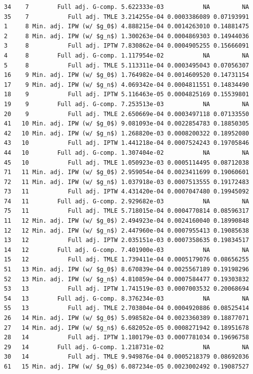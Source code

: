 \documentclass[11pt]{article}\usepackage[]{graphicx}\usepackage[]{color}
\makeatletter
\newenvironment{kframe}{%
 \def\at@end@of@kframe{}%
 \ifinner\ifhmode%
  \def\at@end@of@kframe{\end{minipage}}%
  \begin{minipage}{\columnwidth}%
 \fi\fi%
 \def\FrameCommand##1{\hskip\@totalleftmargin \hskip-\fboxsep
 \colorbox{shadecolor}{##1}\hskip-\fboxsep
     \hskip-\linewidth \hskip-\@totalleftmargin \hskip\columnwidth}%
 \MakeFramed {\advance\hsize-\width
   \@totalleftmargin\z@ \linewidth\hsize
   \@setminipage}}%
 {\par\unskip\endMakeFramed%
 \at@end@of@kframe}
\newenvironment{knitrout}{}{} %
\makeatother
\begin{document}
\begin{knitrout}
\begin{kframe}
\begin{verbatim}
34    7        Full adj. G-comp. 5.622333e-03           NA         NA
35    7           Full adj. TMLE 3.214255e-04 0.0003386089 0.07193991
1     8 Min. adj. IPW (w/ $g_0$) 4.888215e-04 0.0014263010 0.14881475
2     8 Min. adj. IPW (w/ $g_n$) 1.300263e-04 0.0004869303 0.14944036
3     8           Full adj. IPTW 7.830862e-04 0.0004905255 0.15666091
4     8        Full adj. G-comp. 1.117954e-02           NA         NA
5     8           Full adj. TMLE 5.113311e-04 0.0003495043 0.07056307
16    9 Min. adj. IPW (w/ $g_0$) 1.764982e-04 0.0014609520 0.14731154
17    9 Min. adj. IPW (w/ $g_n$) 4.069342e-04 0.0004811551 0.14834490
18    9           Full adj. IPTW 5.116463e-05 0.0004825169 0.15539801
19    9        Full adj. G-comp. 7.253513e-03           NA         NA
20    9           Full adj. TMLE 2.650669e-04 0.0003497118 0.07133550
41   10 Min. adj. IPW (w/ $g_0$) 9.081093e-04 0.0022854783 0.18850305
42   10 Min. adj. IPW (w/ $g_n$) 1.268820e-03 0.0008200322 0.18952080
43   10           Full adj. IPTW 1.441218e-04 0.0007524243 0.19705846
44   10        Full adj. G-comp. 1.307404e-02           NA         NA
45   10           Full adj. TMLE 1.050923e-03 0.0005114495 0.08712038
71   11 Min. adj. IPW (w/ $g_0$) 2.959054e-04 0.0023411699 0.19060601
72   11 Min. adj. IPW (w/ $g_n$) 1.037918e-03 0.0007513555 0.19172483
73   11           Full adj. IPTW 4.431420e-04 0.0007047480 0.19945092
74   11        Full adj. G-comp. 2.929682e-03           NA         NA
75   11           Full adj. TMLE 5.718015e-04 0.0004770814 0.08596317
11   12 Min. adj. IPW (w/ $g_0$) 2.494923e-04 0.0024160040 0.18990848
12   12 Min. adj. IPW (w/ $g_n$) 2.447960e-04 0.0007955413 0.19085638
13   12           Full adj. IPTW 2.035151e-03 0.0007358635 0.19834517
14   12        Full adj. G-comp. 7.401900e-03           NA         NA
15   12           Full adj. TMLE 1.739411e-04 0.0005179076 0.08656255
51   13 Min. adj. IPW (w/ $g_0$) 8.670839e-04 0.0025567189 0.19198296
52   13 Min. adj. IPW (w/ $g_n$) 4.810859e-04 0.0007584477 0.19303832
53   13           Full adj. IPTW 1.741519e-03 0.0007003532 0.20068694
54   13        Full adj. G-comp. 8.376234e-03           NA         NA
55   13           Full adj. TMLE 2.703804e-04 0.0004920886 0.08525414
26   14 Min. adj. IPW (w/ $g_0$) 5.098582e-04 0.0023360389 0.18877071
27   14 Min. adj. IPW (w/ $g_n$) 6.682052e-05 0.0008271942 0.18951678
28   14           Full adj. IPTW 1.180179e-03 0.0007781034 0.19696758
29   14        Full adj. G-comp. 1.218731e-02           NA         NA
30   14           Full adj. TMLE 9.949876e-04 0.0005218379 0.08692036
61   15 Min. adj. IPW (w/ $g_0$) 6.087234e-05 0.0023002492 0.19087527

\end{verbatim}
\end{kframe}
\end{knitrout}
\end{document}
